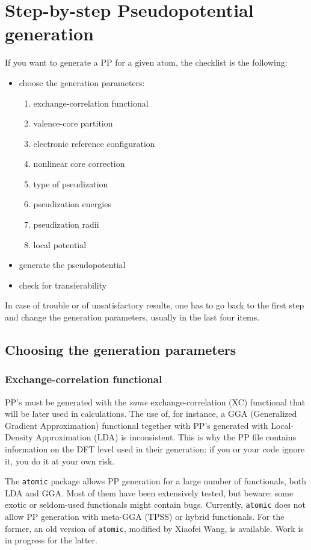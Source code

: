 \documentclass[12pt,a4paper]{article}
\begin{document}
\section{Step-by-step Pseudopotential generation} 

If you want to generate a PP for a given atom, the checklist is the
following:

\begin{itemize}
\item choose the generation parameters:
\begin{enumerate}
\item exchange-correlation functional
\item valence-core partition
\item electronic reference configuration
\item nonlinear core correction
\item type of pseudization
\item pseudization energies 
\item pseudization radii
\item local potential
\end{enumerate}
\item generate the pseudopotential
\item check for transferability
\end{itemize}
In case of trouble or of unsatisfactory results, one has to 
go back to the first step and change the generation parameters,
usually in the last four items.

\subsection{Choosing the generation parameters}

\subsubsection{Exchange-correlation functional}
\label{XC}
PP's must be generated with the {\em same} exchange-correlation
(XC) functional that will
be later used in calculations. The use of, for instance, a
GGA (Generalized Gradient Approximation) functional tegether
with PP's generated with Local-Density Approximation (LDA) 
is inconsistent. This is why the PP file contains information 
on the DFT level used in their generation: if you or your code 
ignore it, you do it at your own risk.

The \texttt{atomic} package allows PP generation for a large number of 
functionals, both LDA and GGA. Most of them have 
been extensively tested, but beware: some exotic or seldom-used functionals 
might contain bugs. Currently, \texttt{atomic} does not allow PP generation
with meta-GGA (TPSS) or hybrid functionals. For the former, an old version 
of \texttt{atomic}, modified by Xiaofei Wang, is available. 
Work is in progress for the latter.
\end{document}
